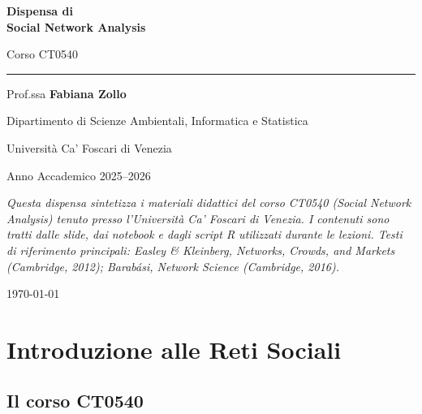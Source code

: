 \documentclass[12pt,a4paper]{article}
\begin{document}
\begin{titlepage}
  \centering
  \vspace*{2cm}

  {\Huge\bfseries Dispensa di\\[0.4em] Social Network Analysis\par}
  \vspace{0.5cm}
  {\large Corso CT0540\par}
  \vspace{1.5cm}
  \rule{10cm}{1pt}\par
  \vspace{1cm}
  {\large Prof.ssa \textbf{Fabiana Zollo}\par}
  \vspace{0.3cm}
  {\normalsize Dipartimento di Scienze Ambientali, Informatica e Statistica\par}
  {\normalsize Università Ca' Foscari di Venezia\par}
  \vspace{1.5cm}
  {\normalsize Anno Accademico 2025–2026\par}
  \vspace{2cm}

  \begin{minipage}{0.85\textwidth}
    \small\itshape
    Questa dispensa sintetizza i materiali didattici del corso CT0540 (Social Network Analysis)
    tenuto presso l'Università Ca' Foscari di Venezia. I contenuti sono tratti dalle slide,
    dai notebook e dagli script R utilizzati durante le lezioni.
    Testi di riferimento principali: Easley \& Kleinberg, \textit{Networks, Crowds, and Markets}
    (Cambridge, 2012); Barabási, \textit{Network Science} (Cambridge, 2016).
  \end{minipage}

  \vfill
  {\small\today}
\end{titlepage}

\tableofcontents
\newpage

\section{Introduzione alle Reti Sociali}

\subsection{Il corso CT0540}
\end{document}
